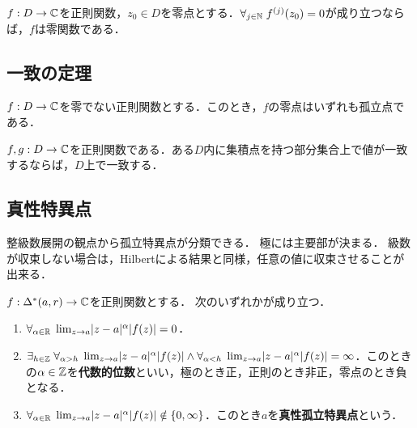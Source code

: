 \documentclass[uplatex, dvipdfmx]{jsreport}
\begin{document}
\begin{proposition}[位数は有限である]
    $f:D\to\mathbb{C}$を正則関数，$z_0\in D$を零点とする．$\forall_{j\in\mathbb{N}}\;f^{(j)}(z_0)=0$が成り立つならば，$f$は零関数である．
\end{proposition}

\subsection{一致の定理}

\begin{theorem}
    $f:D\to\mathbb{C}$を零でない正則関数とする．このとき，$f$の零点はいずれも孤立点である．
\end{theorem}

\begin{corollary}[一致の定理]
    $f,g:D\to\mathbb{C}$を正則関数である．ある$D$内に集積点を持つ部分集合上で値が一致するならば，$D$上で一致する．
\end{corollary}

\subsection{真性特異点}

\begin{tcolorbox}[colframe=ForestGreen, colback=ForestGreen!10!white,breakable,colbacktitle=ForestGreen!40!white,coltitle=black,fonttitle=\bfseries\sffamily,
title=]
    整級数展開の観点から孤立特異点が分類できる．
    極には主要部が決まる．
    級数が収束しない場合は，Hilbertによる結果と同様，任意の値に収束させることが出来る．
\end{tcolorbox}

\begin{proposition}[孤立特異点の分類]
    $f:\Delta^*(a,r)\to\mathbb{C}$を正則関数とする．
    次のいずれかが成り立つ．
    \begin{enumerate}
        \item $\forall_{\alpha\in\mathbb{R}}\;\lim_{z\to a}\lvert z-a\rvert^\alpha \lvert f(z)\rvert=0$．
        \item $\exists_{h\in\mathbb{Z}}\;\forall_{\alpha>h}\;\lim_{z\to a}\lvert z-a\rvert^\alpha\lvert f(z)\rvert\land\forall_{\alpha<h}\;\lim_{z\to a}\lvert z-a\rvert^\alpha\lvert f(z)\rvert=\infty$．このときの$\alpha\in\mathbb{Z}$を\textbf{代数的位数}といい，極のとき正，正則のとき非正，零点のとき負となる．
        \item $\forall_{\alpha\in\mathbb{R}}\;\lim_{z\to a}\lvert z-a\rvert^\alpha\lvert f(z)\rvert\notin\left\{0,\infty\right\}$．このとき$a$を\textbf{真性孤立特異点}という．
    \end{enumerate}
\end{proposition}
\end{document}
